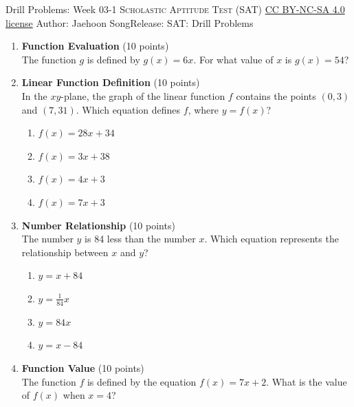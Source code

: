\newpage\handout
{Drill Problems: Week 03-1}
{\textsc{Scholastic Aptitude Test (SAT)}}
{\href{https://creativecommons.org/licenses/by-nc-sa/4.0/}{CC BY-NC-SA 4.0 license}}
{Author: Jaehoon Song}{Release: \generatedOn}
{SAT: Drill Problems}


\begin{enumerate}
  \item \textbf{Function Evaluation} (10 points)\\
  The function $g$ is defined by $g(x)=6x$. For what value of $x$ is $g(x)=54$?
  \begin{subanswer}
  \end{subanswer}

  \item \textbf{Linear Function Definition} (10 points)\\
  In the $xy$-plane, the graph of the linear function $f$ contains the points $(0,3)$ and $(7,31)$. Which equation defines $f$, where $y=f(x)$?\\
  \begin{enumerate}[label=(\Alph*)]
    \item $f(x)=28x+34$
    \item $f(x)=3x+38$
    \item $f(x)=4x+3$
    \item $f(x)=7x+3$
  \end{enumerate}
  \begin{subanswer}
  \end{subanswer}

  \item \textbf{Number Relationship} (10 points)\\
  The number $y$ is 84 less than the number $x$. Which equation represents the relationship between $x$ and $y$?\\
  \begin{enumerate}[label=(\Alph*)]
    \item $y=x+84$
    \item $y=\frac{1}{84}x$
    \item $y=84x$
    \item $y=x-84$
  \end{enumerate}
  \begin{subanswer}
  \end{subanswer}

  \item \textbf{Function Value} (10 points)\\
  The function $f$ is defined by the equation $f(x)=7x+2$. What is the value of $f(x)$ when $x=4$?
  \begin{subanswer}
  \end{subanswer}




\end{enumerate}
